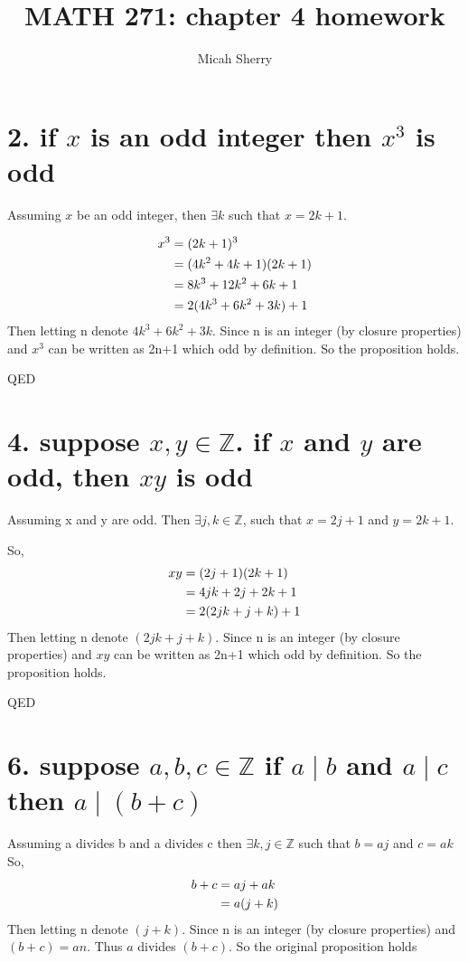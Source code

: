 \documentclass{article}
\title{MATH 271: chapter 4 homework}
\author{Micah Sherry}
\begin{document}
\maketitle

\section*{2. if $x$ is an odd integer then $x^3$ is odd}	
	Assuming $x$ be an odd integer, then $\exists k $ such that $x=2k+1$.
	
	\begin{equation}\notag
	\begin{aligned}
	x^3 &= (2k+1)^3  \\
		&= (4k^2+4k+1)(2k+1)\\
		&= 8k^3+12k^2+6k+1\\
		&= 2(4k^3+6k^2+3k)+1
	\end{aligned}
	\end{equation}
	Then letting n denote $4k^3+6k^2+3k$. Since n is an integer (by closure properties) and $x^3$ can be written as 2n+1 which odd by definition. So the proposition holds. 
	
	\hfill QED
	
\section*{4. suppose $x , y\in \mathbb{Z}$. if $x$ and $y$ are odd, then $xy$ is odd}
Assuming x and y are odd. Then
$\exists j,k \in \mathbb{Z}$, such that $x=2j+1$ and $y=2k+1 $.

So, 	
\begin{equation}\notag
	\begin{aligned}
		xy  &= (2j+1)(2k+1)\\
			&= 4jk+2j+2k+1\\
			&= 2(2jk + j+ k) + 1
	\end{aligned}
\end{equation}
	Then letting n denote $(2jk + j+ k)$. Since n is an integer (by closure properties) and $xy$ can be written as 2n+1 which odd by definition. So the proposition holds. 
	
	\hfill QED

\section*{6. suppose $a,b,c \in \mathbb{Z}$ if $a \mid b$ and $a \mid c$ then $a \mid (b+c)$}
Assuming a divides b and a divides c then $\exists k,j \in \mathbb{Z}$ such that $b=aj$ and $c=ak$
So, 
\begin{equation}\notag
	\begin{aligned}
	b+c &= aj+ak\\
		&= a(j+k)		
	\end{aligned}
\end{equation} 
Then letting n denote $(j+k)$. Since n is an integer (by closure properties) and $(b+c) = an$. Thus $a$ divides $(b + c)$. So the original proposition holds
\end{document}
